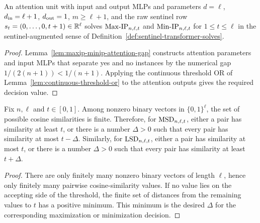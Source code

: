 \begin{theorem}
  \label{thm:transformer-solves-maxip-minip}
  An attention unit with input and output MLPs and parameters
  $d=\ell$, $d_{\rm in}=\ell+1$, $d_{\rm out}=1$, $m\geq\ell+1$, and the raw
  sentinel row $s_t=(0,\ldots,0,t+1)\in\mathbb{R}^\ell$ solves
  $\mathrm{Max\mbox{-}IP}_{n,\ell,t}$ and $\mathrm{Min\mbox{-}IP}_{n,\ell,t}$ for $1\leq t\leq\ell$ in the
  sentinel-augmented sense of Definition~\ref{def:sentinel-transformer-solves}.
\end{theorem}
\begin{proof}
  Lemma~\ref{lem:maxip-minip-attention-gap} constructs attention parameters and
  input MLPs that separate yes and no instances by the numerical gap
  $1/(2(n+1))<1/(n+1)$.  Applying the continuous threshold OR of
  Lemma~\ref{lem:continuous-threshold-or} to the attention outputs gives the
  required decision value.
\end{proof}

\begin{lemma}
  \label{lem:finite-cosine-threshold-gap}
  Fix $n,\ell$ and $t\in[0,1]$.  Among nonzero binary vectors in
  $\{0,1\}^{\ell}$, the set of possible cosine similarities is finite.
  Therefore, for $\mathrm{MSD}_{n,\ell,t}$, either a pair has similarity at least $t$,
  or there is a number $\Delta>0$ such that every pair has similarity at most
  $t-\Delta$.  Similarly, for $\mathrm{LSD}_{n,\ell,t}$, either a pair has similarity
  at most $t$, or there is a number $\Delta>0$ such that every pair has
  similarity at least $t+\Delta$.
\end{lemma}
\begin{proof}
  There are only finitely many nonzero binary vectors of length $\ell$, hence
  only finitely many pairwise cosine-similarity values.  If no value lies on the
  accepting side of the threshold, the finite set of distances from the
  remaining values to $t$ has a positive minimum.  This minimum is the desired
  $\Delta$ for the corresponding maximization or minimization decision.
\end{proof}

